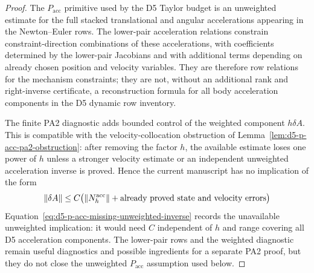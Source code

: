 \documentclass[preprint,12pt]{elsarticle}
\begin{document}
\begin{proof}
The \(P_{\mathrm{acc}}\) primitive used by the D5 Taylor budget is an
unweighted estimate for the full stacked translational and angular
accelerations appearing in the Newton--Euler rows.  The lower-pair
acceleration relations constrain constraint-direction combinations of these
accelerations, with coefficients determined by the lower-pair Jacobians and
with additional terms depending on already chosen position and velocity
variables.  They are therefore row relations for the mechanism constraints;
they are not, without an additional rank and right-inverse certificate, a
reconstruction formula for all body acceleration components in the D5 dynamic
row inventory.

The finite PA2 diagnostic adds bounded control of the weighted component
\(h\delta A\).  This is compatible with the velocity-collocation obstruction
of Lemma~\ref{lem:d5-p-acc-pa2-obstruction}: after removing the factor \(h\),
the available estimate loses one power of \(h\) unless a stronger velocity
estimate or an independent unweighted acceleration inverse is proved.  Hence
the current manuscript has no implication of the form
\begin{equation}
\label{eq:d5-p-acc-missing-unweighted-inverse}
  \|\delta A\|
  \le C\bigl(\|N_h^{\mathrm{acc}}\|+
             \hbox{already proved state and velocity errors}\bigr)
\end{equation}
Equation~\eqref{eq:d5-p-acc-missing-unweighted-inverse} records the
unavailable unweighted implication: it would need \(C\) independent of \(h\)
and range covering all D5 acceleration components.  The lower-pair rows and
the weighted diagnostic remain useful
diagnostics and possible ingredients for a separate PA2 proof, but they do not
close the unweighted \(P_{\mathrm{acc}}\) assumption used below.
\end{proof}
\end{document}
